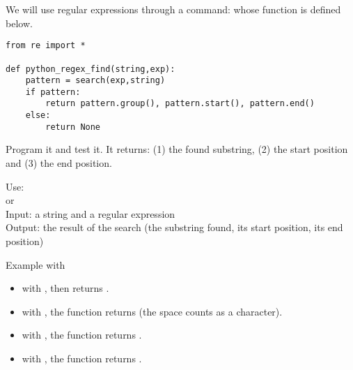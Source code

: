 \documentclass[11pt,class=report,crop=false]{standalone}
\begin{document}
\begin{cours}
 

\bigskip

We will use regular expressions through a command:  
whose function is defined below.


\begin{lstlisting}
from re import *

def python_regex_find(string,exp):
    pattern = search(exp,string)
    if pattern:
        return pattern.group(), pattern.start(), pattern.end()
    else:
        return None
\end{lstlisting}

Program it and test it. It returns: (1) the found substring, (2) the start position and (3) the end position.

\begin{fonctionpython}
    Use:  \\
    \hspace*{9ex} or \\
    Input: a string  and a regular expression  \\
    Output: the result of the search (the substring found, its start position, its end position) 
  
  \medskip
     
   Example with 
  \begin{itemize}  
    \item with , then  returns
    .
    \item with , the function returns
     (the space counts as a character).
    \item with , the function returns
    .
    
    
    \item with , the function returns .
    

  \end{itemize} 
  \end{fonctionpython}  

\end{cours}


\end{document}
